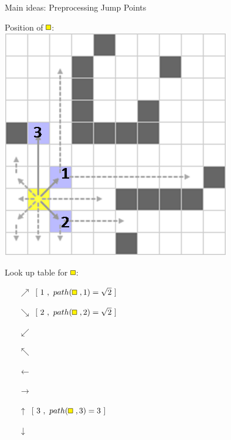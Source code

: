 \documentclass{presentation}
\begin{document}
\begin{frame}
\end{frame}


\begin{frame}{Main ideas: Preprocessing Jump Points}
	\begin{minipage}{0.45\textwidth}
		Position of $\tikz{\path[draw=black,fill=yellow] (0,0) rectangle (2mm,2mm);}$:\\
		\vspace{3mm}
		\includegraphics[width=\textwidth]{figures/jps_geschnitten/1(yellow).png}
	\end{minipage}%
	\hfill%
	\begin{minipage}{0.45\textwidth}
		Look up table for $\tikz{\path[draw=black,fill=yellow] (0,0) rectangle (2mm,2mm);}$:\\
		\vspace{3mm}
		\begin{itemize}
		\pause
		\item[$\nearrow$] $[\ 1\ ,\ path(\tikz{\path[draw=black,fill=yellow] (0,0) rectangle (2mm,2mm);}\ ,1)=\sqrt{2}\ ]$ 
		\pause
		\item[$\searrow$] $[\ 2\ ,\ path(\tikz{\path[draw=black,fill=yellow] (0,0) rectangle (2mm,2mm);}\ ,2)=\sqrt{2}\ ]$
		\item[$\swarrow$]
		\item[$\nwarrow$]
		\item[$\leftarrow$]
		\item[$\rightarrow$]
		\pause
		\item[$\uparrow$] $[\ 3\ ,\ path(\tikz{\path[draw=black,fill=yellow] (0,0) rectangle (2mm,2mm);}\ ,3)=3\ ]$
		\item[$\downarrow$]
		\end{itemize}
	\end{minipage}
\end{frame}
\end{document}
